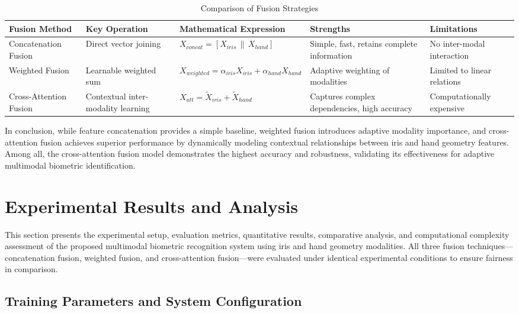 \documentclass[12pt,a4paper]{report}
\begin{document}
\begin{table}[h]
\centering
\caption{Comparison of Fusion Strategies}
\begin{tabular}{|p{2.5cm}|p{3cm}|p{3.5cm}|p{2.5cm}|p{3cm}|}
\hline
\textbf{Fusion Method} & \textbf{Key Operation} & \textbf{Mathematical Expression} & \textbf{Strengths} & \textbf{Limitations} \\
\hline
Concatenation Fusion & Direct vector joining & \( X_{concat} = [X_{iris} \, \| \, X_{hand}] \) & Simple, fast, retains complete information & No inter-modal interaction \\
\hline
Weighted Fusion & Learnable weighted sum & \( X_{weighted} = \alpha_{iris} X_{iris} + \alpha_{hand} X_{hand} \) & Adaptive weighting of modalities & Limited to linear relations \\
\hline
Cross-Attention Fusion & Contextual inter-modality learning & \( X_{att} = \tilde{X}_{iris} + \tilde{X}_{hand} \) & Captures complex dependencies, high accuracy & Computationally expensive \\
\hline
\end{tabular}
\end{table}

In conclusion, while feature concatenation provides a simple baseline, weighted fusion introduces adaptive modality importance, and cross-attention fusion achieves superior performance by dynamically modeling contextual relationships between iris and hand geometry features. Among all, the cross-attention fusion model demonstrates the highest accuracy and robustness, validating its effectiveness for adaptive multimodal biometric identification.

\vspace{10em} 
\section{Experimental Results and Analysis}

This section presents the experimental setup, evaluation metrics, quantitative results, comparative analysis, and computational complexity assessment of the proposed multimodal biometric recognition system using iris and hand geometry modalities. All three fusion techniques---concatenation fusion, weighted fusion, and cross-attention fusion---were evaluated under identical experimental conditions to ensure fairness in comparison.

\subsection{Training Parameters and System Configuration}
\end{document}
